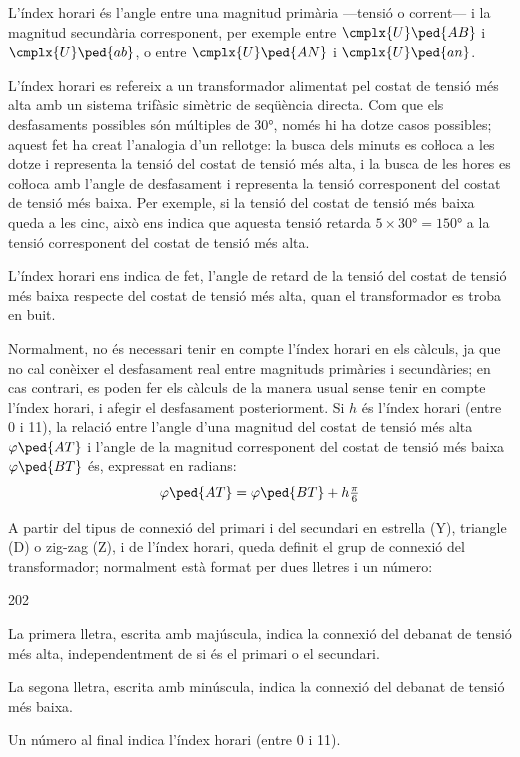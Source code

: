 L'índex horari és l'angle entre una magnitud  primària ---tensió o corrent--- i la magnitud secundària corresponent, per exemple entre $\cmplx{U}\ped{AB}$ i $\cmplx{U}\ped{ab}$, o entre $\cmplx{U}\ped{AN}$ i $\cmplx{U}\ped{an}$.

L'índex horari es refereix a un transformador alimentat pel costat de tensió més alta  amb un sistema trifàsic simètric de seqüència directa. Com que els desfasaments possibles són múltiples de \ang{30}, només hi ha dotze casos possibles; aquest fet ha creat l'analogia d'un rellotge: la busca dels minuts es coŀloca a les dotze i representa la tensió del costat de tensió més alta, i la busca de les hores es coŀloca amb l'angle de desfasament i representa la tensió corresponent del costat de tensió més baixa. Per exemple, si la tensió del costat de tensió més baixa queda a les cinc, això ens indica que aquesta tensió retarda $5\times \ang{30}= \ang{150}$ a la tensió corresponent del costat de tensió més alta.

L'índex horari ens indica de fet, l'angle de retard de la tensió del costat de tensió més baixa respecte del costat de tensió més alta, quan el transformador es troba en buit.

Normalment, no és necessari tenir en compte l'índex horari en els càlculs, ja que no cal conèixer el desfasament real entre magnituds primàries i secundàries; en cas contrari, es poden fer els càlculs de la manera usual sense tenir en compte l'índex horari, i afegir el desfasament posteriorment. Si $h$ és l'índex horari (entre 0 i 11), la relació entre l'angle d'una magnitud del costat de tensió més alta $\varphi\ped{AT}$ i l'angle de la magnitud corresponent del costat de tensió més baixa $\varphi\ped{BT}$ és, expressat en radians:
\begin{equation}
    \varphi\ped{AT} = \varphi\ped{BT} + h\tfrac{\pi}{6}\label{eq:fi-AT-BT}
\end{equation}


A partir del tipus de connexió del primari i del secundari en estrella (Y), triangle (D) o zig-zag (Z), i de l'índex horari, queda definit el grup de connexió del transformador; normalment està format per dues lletres i un número:
\begin{dingautolist}{202}
   \item La primera lletra, escrita amb majúscula, indica la connexió del debanat de tensió més alta, independentment de si és el primari o el secundari.
   \item La segona lletra, escrita amb minúscula, indica la connexió del debanat de tensió més baixa.
   \item Un número al final indica l'índex horari (entre 0 i 11).
\end{dingautolist}

